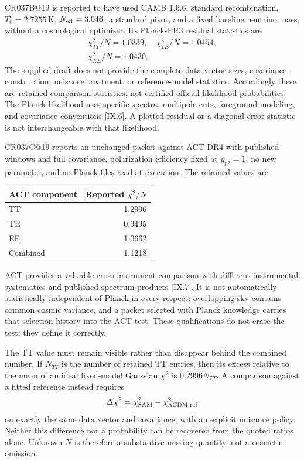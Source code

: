 CR037B@19 is reported to have used CAMB 1.6.6, standard recombination, $T_0=2.7255\,\mathrm K$, $N_{\rm eff}=3.046$, a standard pivot, and a fixed baseline neutrino mass, without a cosmological optimizer. Its Planck-PR3 residual statistics are
\begin{equation}
 \begin{gathered}
 \chi^2_{TT}/N=1.0339,\quad \chi^2_{TE}/N=1.0454,\\
 \chi^2_{EE}/N=1.0430.
 \end{gathered}
 \label{c9:planckreceipt}
\end{equation}
The supplied draft does not provide the complete data-vector sizes, covariance construction, nuisance treatment, or reference-model statistics. Accordingly these are retained comparison statistics, not certified official-likelihood probabilities. The Planck likelihood uses specific spectra, multipole cuts, foreground modeling, and covariance conventions [IX.6]. A plotted residual or a diagonal-error statistic is not interchangeable with that likelihood.

CR037C@19 reports an unchanged packet against ACT DR4 with published windows and full covariance, polarization efficiency fixed at $y_{p2}=1$, no new parameter, and no Planck files read at execution. The retained values are
\begin{center}
\begin{tabular}{lr}
\toprule
ACT component & Reported $\chi^2/N$\\
\midrule
TT&1.2996\\
TE&0.9495\\
EE&1.0662\\
Combined&1.1218\\
\bottomrule
\end{tabular}
\end{center}
ACT provides a valuable cross-instrument comparison with different instrumental systematics and published spectrum products [IX.7]. It is not automatically statistically independent of Planck in every respect: overlapping sky contains common cosmic variance, and a packet selected with Planck knowledge carries that selection history into the ACT test. These qualifications do not erase the test; they define it correctly.

The TT value must remain visible rather than disappear behind the combined number. If $N_{TT}$ is the number of retained TT entries, then its excess relative to the mean of an ideal fixed-model Gaussian $\chi^2$ is $0.2996N_{TT}$. A comparison against a fitted reference instead requires
\begin{equation}
 \Delta\chi^2=\chi^2_{\rm SAM}-\chi^2_{\Lambda{\rm CDM},{\rm ref}}
 \label{c9:deltachi}
\end{equation}
on exactly the same data vector and covariance, with an explicit nuisance policy. Neither this difference nor a probability can be recovered from the quoted ratios alone. Unknown $N$ is therefore a substantive missing quantity, not a cosmetic omission.

